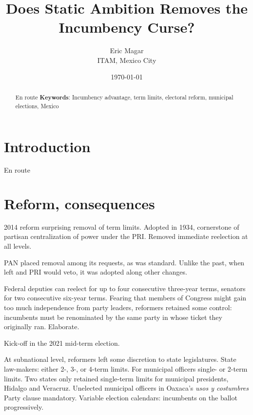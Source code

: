 \documentclass[letter,12pt]{article}
\begin{document}
\title{Does Static Ambition Removes the Incumbency Curse?}
\author{Eric Magar \\ ITAM, Mexico City}
\date{\today}
\maketitle


\begin{abstract}
\noindent En route
\newline
\newline
\textbf{Keywords}: Incumbency advantage, term limits, electoral reform, municipal elections, Mexico
\end{abstract}



\section{Introduction}

\noindent En route

\section{Reform, consequences}

2014 reform surprising removal of term limits. Adopted in 1934, cornerstone of partisan centralization of power under the PRI. Removed immediate reelection at all levels.

PAN placed removal among its requests, as was standard. Unlike the past, when left and PRI would veto, it was adopted along other changes.

Federal deputies can reelect for up to four consecutive three-year terms, senators for two consecutive six-year terms. Fearing that members of Congress might gain too much independence from party leaders, reformers retained some control: incumbents must be renominated by the same party in whose ticket they originally ran. Elaborate. 

Kick-off in the 2021 mid-term election.

At subnational level, reformers left some discretion to state legislatures. State law-makers: either 2-, 3-, or 4-term limits. For municipal officers single- or 2-term limits. Two states only retained single-term limits for municipal presidents, Hidalgo and Veracruz. Unelected municipal officers in Oaxaca's \emph{usos y costumbres} Party clause mandatory. Variable election calendars: incumbents on the ballot progressively. 
\end{document}
